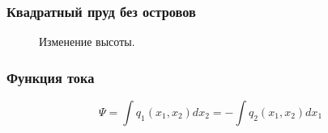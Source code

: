 \documentclass[10pt,utf8,presentation,compress]{beamer}
\begin{document}
\begin{frame}
\frametitle{Квадратный пруд без островов}
	\begin{figure}[H]
		\centering
		\hfill
		\hfill
		\caption{Изменение высоты.}
	\end{figure}
\end{frame}

\begin{frame}
\frametitle{Функция тока}
	\begin{equation}
		\Psi = \int q_1(x_1, x_2) dx_2 = - \int q_2(x_1, x_2) dx_1
	\end{equation}
\end{frame}
\end{document}
